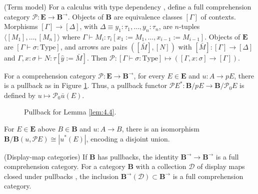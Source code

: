 \documentclass{article}
\begin{document}
\begin{example}
\label{ex:4.3}
(Term model) For a calculus with type dependency \cite{MartinLof1984, Troelstra1986}, define a full comprehension category $\mathscr{P} : \mathbf{E} \to \mathbf{B}^{\to}$. Objects of $\mathbf{B}$ are equivalence classes $[\Gamma]$ of contexts. Morphisms $[\Gamma] \to [\Delta]$, with $\Delta \equiv y_1 : \tau_1, \ldots, y_n : \tau_n$, are $n$-tuples $\langle [M_1], \ldots, [M_n] \rangle$ where $\Gamma \vdash M_i : \tau_i[x_1 := M_1, \ldots, x_{i-1} := M_{i-1}]$. Objects of $\mathbf{E}$ are $[\Gamma \vdash \sigma : \text{Type}]$, and arrows are pairs $([\bar{M}], [N])$ with $[\bar{M}] : [\Gamma] \to [\Delta]$ and $\Gamma, x : \sigma \vdash N : \tau[\hat{y} := \bar{M}]$. Then $\mathscr{P} : [\Gamma \vdash \sigma : \text{Type}] \mapsto ([\Gamma, x : \sigma] \to [\Gamma])$.
\end{example}

\begin{lemma}
\label{lem:4.4}
For a comprehension category $\mathscr{P} : \mathbf{E} \to \mathbf{B}^{\to}$, for every $E \in \mathbf{E}$ and $u : A \to p E$, there is a pullback as in Figure \ref{fig:pullback-4.4}. Thus, a pullback functor $\mathscr{P} E^* : \mathbf{B}/p E \to \mathbf{B}/\mathscr{P}_0 E$ is defined by $u \mapsto \mathscr{P}_0 \bar{u}(E)$.
\begin{figure}[h]
    \centering
    \caption{Pullback for Lemma \ref{lem:4.4}.}
    \label{fig:pullback-4.4}
\end{figure}
\end{lemma}

For $E \in \mathbf{E}$ above $B \in \mathbf{B}$ and $u : A \to B$, there is an isomorphism $\mathbf{B}/\mathbf{B}(u, \mathscr{P} E) \cong |u^*(E)|$, encoding a disjoint union.

\begin{example}
\label{ex:4.5}
(Display-map categories) If $\mathbf{B}$ has pullbacks, the identity $\mathbf{B}^{\to} \to \mathbf{B}^{\to}$ is a full comprehension category. For a category $\mathbf{B}$ with a collection $\mathscr{D}$ of display maps closed under pullbacks \cite{Taylor1986, HylandPitts1989, Lamarche1988}, the inclusion $\mathbf{B}^{\to}(\mathscr{D}) \subset \mathbf{B}^{\to}$ is a full comprehension category.
\end{example}
\end{document}
